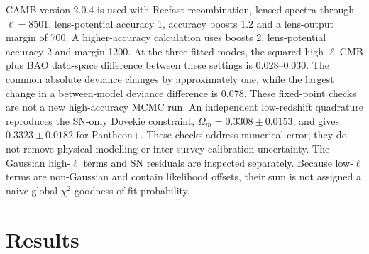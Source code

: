 \documentclass[fleqn,usenatbib]{mnras}
\begin{document}
CAMB version 2.0.4 is used with Recfast recombination, lensed spectra through
$\ell=8501$, lens-potential accuracy 1, accuracy boosts 1.2 and a lens-output
margin of 700. A higher-accuracy calculation uses boosts 2, lens-potential
accuracy 2 and margin 1200. At the three fitted modes, the squared high-$\ell$ CMB plus BAO data-space difference between these settings is 0.028--0.030. The common absolute deviance changes by approximately one, while the largest change in a between-model deviance difference is 0.078. These fixed-point checks are not a new high-accuracy MCMC run. An independent low-redshift quadrature reproduces the SN-only Dovekie constraint, $\Omega_m=0.3308\pm0.0153$, and gives $0.3323\pm0.0182$ for Pantheon+. These checks address numerical
error; they do not remove physical modelling or inter-survey calibration
uncertainty. The Gaussian high-$\ell$ terms and SN residuals are inspected
separately. Because low-$\ell$ terms are non-Gaussian and contain likelihood
offsets, their sum is not assigned a naive global $\chi^2$ goodness-of-fit
probability.

\section{Results}\label{sec:results}
\end{document}
